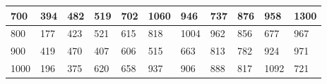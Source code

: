 \documentclass[10pt,letterpaper]{article}
\begin{document}
\begin{center}
\begin{table}
\begin{tabular} { |m{0.5cm}|m{1.3cm}|m{1.3cm}|m{1.3cm}|m{1.3cm}|m{1.3cm}|m{1.3cm}|m{1.3cm}|m{1.3cm}|m{1.3cm}|m{1.3cm}|}
\hline
\cellcolor{Gray}700 & \Large 394 & \Large 482 & \Large 519 & \Large 702 & \Large 1060 & \Large 946 & \Large 737 & \Large 876 & \Large 958 & \Large 1300 \\
\hline
\cellcolor{Gray}800 & \Large 177 & \Large 423 & \Large 521 & \Large 615 & \Large 818 & \Large 1004 & \Large 962 & \Large 856 & \Large 677 & \Large 967 \\
\hline
\cellcolor{Gray}900 & \Large 419 & \Large 470 & \Large 407 & \Large 606 & \Large 515 & \Large 663 & \Large 813 & \Large 782 & \Large 924 & \Large 971 \\
\hline
\cellcolor{Gray}1000 & \Large 196 & \Large 375 & \Large 620 & \Large 658 & \Large 937 & \Large 906 & \Large 888 & \Large 817 & \Large 1092 & \Large 721 \\
\hline
\end{tabular} \\
\end{table}
\end{center}
\newpage 
{}
\end{document}
